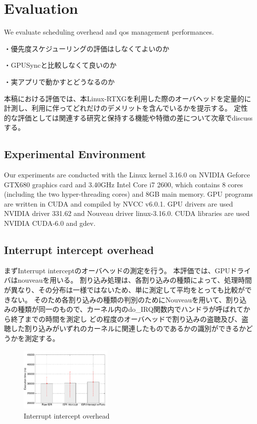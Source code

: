 \section{Evaluation}
We evaluate scheduling overhead and qos management performances.

・優先度スケジューリングの評価はしなくてよいのか

・GPUSyncと比較しなくて良いのか

・実アプリで動かすとどうなるのか

本稿における評価では、本Linux-RTXGを利用した際のオーバヘッドを定量的に計測し、利用に伴ってどれだけのデメリットを含んでいるかを提示する。
定性的な評価としては関連する研究と保持する機能や特徴の差について次章でdiscussする。

\subsection{Experimental Environment}
Our experiments are conducted with the Linux kernel 3.16.0 on NVIDIA Geforce GTX680 graphics card and 3.40GHz Intel Core i7 2600, which contains 8 cores (including the two hyper-threading cores) and 8GB main memory.
GPU programs are written in CUDA and compiled by NVCC v6.0.1.
GPU drivers are used NVIDIA driver 331.62 and Nouveau driver linux-3.16.0.
CUDA libraries are used NVIDIA CUDA-6.0 and gdev.

\subsection{Interrupt intercept overhead}
まずInterrupt interceptのオーバヘッドの測定を行う。
本評価では、GPUドライバはnouveauを用いる。
割り込み処理は、各割り込みの種類によって、処理時間が異なり、その分布は一様ではないため、単に測定して平均をとっても比較ができない。
そのため各割り込みの種類の判別のためにNouveauを用いて、割り込みの種類が同一のもので、カーネル内のdo\_IRQ関数内でハンドラが呼ばれてから終了までの時間を測定し
どの程度のオーバヘッドで割り込みの盗聴及び、盗聴した割り込みがいずれのカーネルに関連したものであるかの識別ができるかどうかを測定する。

\begin{figure}[t]
\begin{center}
\includegraphics[width=0.4\textwidth]{img/interrupt.pdf}
\caption{Interrupt intercept overhead}
\end{center}
\label{fig:irq_overhead}
\end{figure}

